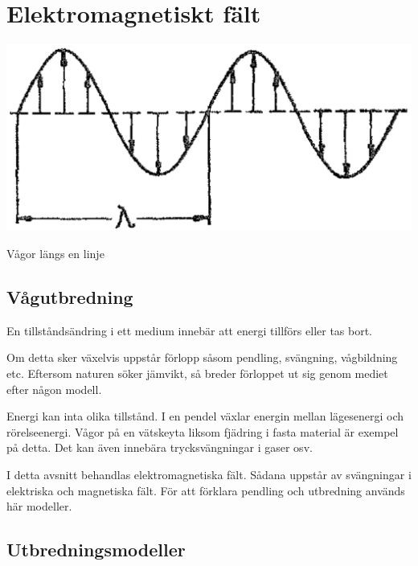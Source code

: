 \section{Elektromagnetiskt fält}

\begin{marginfigure}
  \includegraphics[width=\textwidth]{images/cropped_pdfs/bild_2_1-10.pdf}
  \caption{Vågor längs en linje}
  \label{fig:BildII1-10}
\end{marginfigure}


\subsection{Vågutbredning}

En tillståndsändring i ett medium innebär att energi tillförs eller tas bort.

Om detta sker växelvis uppstår förlopp såsom pendling, svängning,
vågbildning etc.
Eftersom naturen söker jämvikt, så breder förloppet ut sig genom mediet efter
någon modell.

Energi kan inta olika tillstånd. I en pendel växlar energin mellan lägesenergi
och rörelseenergi.
Vågor på en vätskeyta liksom fjädring i fasta material är exempel på detta.
Det kan även innebära trycksvängningar i gaser osv.

I detta avsnitt behandlas elektromagnetiska fält.
Sådana uppstår av svängningar i elektriska och magnetiska fält.
För att förklara pendling och utbredning används här modeller.

\subsection{Utbredningsmodeller}

